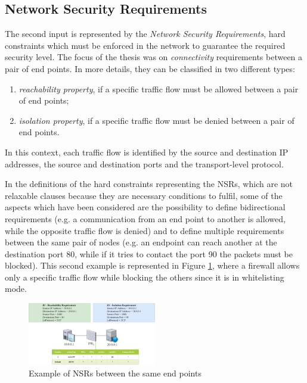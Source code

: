 \documentclass[10pt,a4paper,roman, twocolumn]{article}
\begin{document}
\subsection{Network Security Requirements}

The second input is represented by the \textit{Network Security Requirements}, hard constraints which must be enforced in the network to guarantee the required security level. The focus of the thesis was on \textit{connectivity} requirements between a pair of end points. In more details, they can be classified in two different types: 
\begin{enumerate}
\setlength\itemsep{-0.3em}
\item \textit{reachability property}, if a specific traffic flow must be allowed between a pair of end points;
\item \textit{isolation property}, if a specific traffic flow must be denied between a pair of end points.
\end{enumerate}
In this context, each traffic flow is identified by the source and destination IP addresses, the source and destination ports and the transport-level protocol.

In the definitions of the hard constraints representing the NSRs, which are not relaxable clauses because they are necessary conditions to fulfil, some of the aspects which have been considered are the possibility to define bidirectional requirements (e.g. a communication from an end point to another is allowed, while the opposite traffic flow is denied) and to define multiple requirements between the same pair of nodes (e.g. an endpoint can reach another at the destination port 80, while if it tries to contact the port 90 the packets must be blocked). This second example is represented in Figure \ref{fig:multiple03}, where a firewall allows only a specific traffic flow while blocking the others since it is in whitelisting mode.

\begin{figure}[tbh]
	\centerline{\includegraphics[width=0.5\textwidth]{images/multiple.png}}
	\caption{Example of NSRs between the same end points}
	\label{fig:multiple03}
\end{figure}
\end{document}
